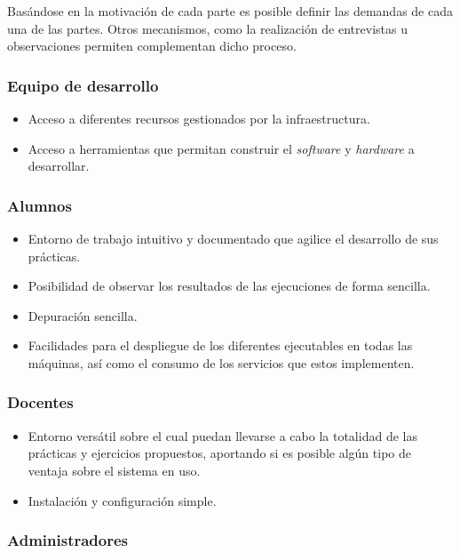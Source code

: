 Basándose en la motivación de cada parte es posible definir las demandas de cada una de las partes. Otros mecanismos, como la realización de entrevistas u observaciones permiten complementan dicho proceso.

\subsubsection{Equipo de desarrollo}

\begin{itemize}
\item Acceso a diferentes recursos gestionados por la infraestructura.
\item Acceso a herramientas que permitan construir el \textit{software} y \textit{hardware} a desarrollar.
\end{itemize}

\subsubsection{Alumnos}

\begin{itemize}
  \item Entorno de trabajo intuitivo y documentado que agilice el desarrollo de sus prácticas.
  \item Posibilidad de observar los resultados de las ejecuciones de forma sencilla.
  \item Depuración sencilla.
  \item Facilidades para el despliegue de los diferentes ejecutables en todas las máquinas, así como el consumo de los servicios que estos implementen.
\end{itemize}

\subsubsection{Docentes}

\begin{itemize}
  \item Entorno versátil sobre el cual puedan llevarse a cabo la totalidad de las prácticas y ejercicios propuestos, aportando si es posible algún tipo de ventaja sobre el sistema en uso.
  \item Instalación y configuración simple.
\end{itemize}

\subsubsection{Administradores}


